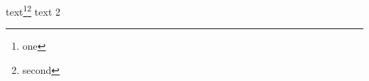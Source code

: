 \documentclass{kapital}
\begin{document}
  text\footnote{one}\footnote{second}
  text 2 
\end{document}
